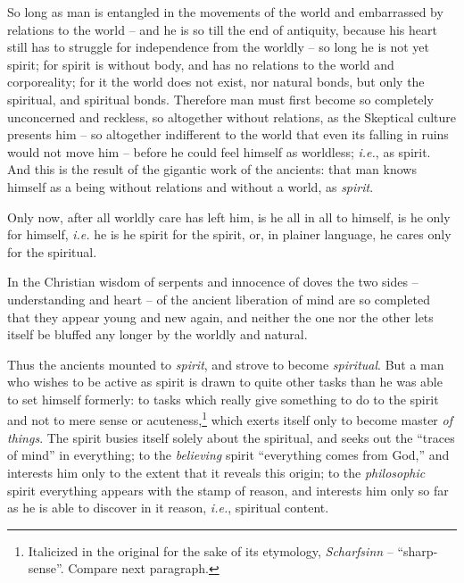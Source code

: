 \documentclass[12pt,a4paper]{book}
\begin{document}
So long as man is entangled in the movements of the world and embarrassed by 
relations to the world -- and he is so till the end of antiquity, because his 
heart still has to struggle for independence from the worldly -- so long he is 
not yet spirit; for spirit is without body, and has no relations to the world 
and corporeality; for it the world does not exist, nor natural bonds, but only 
the spiritual, and spiritual bonds. Therefore man must first become so 
completely unconcerned and reckless, so altogether without relations, as the 
Skeptical culture presents him -- so altogether indifferent to the world that 
even its falling in ruins would not move him -- before he could feel himself 
as worldless; \textit{i.e.}, as spirit. And this is the result of the 
gigantic work of the ancients: that man knows himself as a being without 
relations and without a world, as \textit{spirit}.

Only now, after all worldly care has left him, is he all in all to himself, is 
he only for himself, \textit{i.e.} he is he spirit for the spirit, or, in 
plainer language, he cares only for the spiritual.

In the Christian wisdom of serpents and innocence of doves the two sides -- 
understanding and heart -- of the ancient liberation of mind are so completed 
that they appear young and new again, and neither the one nor the other lets 
itself be bluffed any longer by the worldly and natural.

Thus the ancients mounted to \textit{spirit}, and strove to become 
\textit{spiritual}. But a man who wishes to be active as spirit is drawn to 
quite other tasks than he was able to set himself formerly: to tasks which 
really give something to do to the spirit and not to mere sense or 
acuteness,\footnote{Italicized in the original for the sake of its etymology, 
\textit{Scharfsinn} -- ``sharp-sense''. Compare next paragraph.} which 
exerts itself only to become master \textit{of things}. The spirit busies 
itself solely about the spiritual, and seeks out the ``traces of mind'' in 
everything; to the \textit{believing} spirit ``everything comes from God,'' 
and interests him only to the extent that it reveals this origin; to the 
\textit{philosophic} spirit everything appears with the stamp of reason, and 
interests him only so far as he is able to discover in it reason, \textit{i.e.},
 spiritual content.
\end{document}
